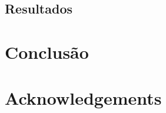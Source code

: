 \documentclass[a4paper, 12pt]{article}
\begin{document}
\subsection{Resultados}


\section{Conclusão}



%

\section{Acknowledgements}



% 



\end{document}
